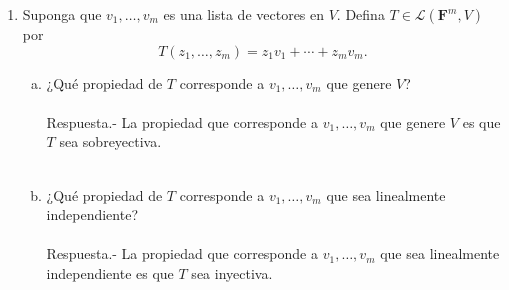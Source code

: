 \begin{enumerate}[\bfseries 1.]
    \item Suponga que $v_1,\ldots,v_m$ es una lista de vectores en $V$. Defina $T\in \mathcal{L}\left(\textbf{F}^m,V\right)$ por
    $$T(z_1,\ldots,z_m)=z_1v_1+\cdots+z_mv_m.$$
	
    \begin{enumerate}[(a)]

	\item ¿Qué propiedad de $T$ corresponde a $v_1,\ldots,v_m$ que genere $V$?\\\\
	    Respuesta.-\; La propiedad que corresponde a $v_1,\ldots,v_m$ que genere $V$ es que $T$ sea sobreyectiva.\\\\

	\item ¿Qué propiedad de $T$ corresponde a $v_1,\ldots,v_m$ que sea linealmente independiente?\\\\
	    Respuesta.-\; La propiedad que corresponde a $v_1,\ldots,v_m$ que sea linealmente independiente es que $T$ sea inyectiva.\\\\
    \end{enumerate}
\end{enumerate}
